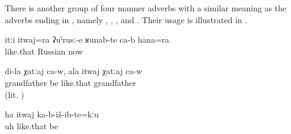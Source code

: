 There is another group of four manner adverbs with a similar meaning as the adverbs ending in , namely , , , and  . Their usage is illustrated in .
%
\begin{exe}
	\ex	\label{ex:They are also like this, like Russians, even now}
	\gll	itːi	itwaj=ra	ʡuˁrusː-e	ʁunab-te	ca-b	hana=ra\\
			like.that	Russian	 		now\\
	\glt	{}

	\ex	\label{ex:(He) is my (real) grandfather. For you he is only an old man (lit. he is like a grandfather of yours)}
	\gll	di-la	χatːaj	ca-w,	ala	itwaj	χatːaj	ca-w\\
			grandfather	be		like.that	grandfather	\\
	\glt	{} (lit. )

	\ex	\label{ex:Uh, and so he did not marry}
	\gll	ha	itwaj	ka-b-iž-ib-te=kːu\\
		uh	like.that	be\\
	\glt	{}
\end{exe}

